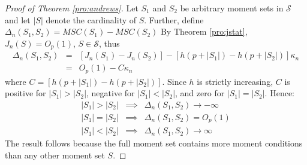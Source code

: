 \documentclass[12pt]{article}
\theoremstyle{definition}
\begin{document}
\begin{proof}[Proof of Theorem \ref{pro:andrews}]
Let $S_1$ and $S_2$ be arbitrary moment sets in $\mathscr{S}$ and let $|S|$ denote the cardinality of $S$. 
Further, define $\Delta_n(S_1, S_2) = MSC(S_1) - MSC(S_2)$
By Theorem \ref{pro:jstat}, $J_n(S) = O_p(1)$, $S \in \mathscr{S}$, thus
	\begin{eqnarray*}
			\Delta_n(S_1, S_2)	&=&   \left[J_{n}(S_1) - J_{n}(S_2)\right] - \left[h\left(p+|S_1|\right) - h\left(p+|S_2|\right)\right]\kappa_n\\
				&=& O_p(1) - C\kappa_n
	\end{eqnarray*}
where $C = \left[h\left(p+|S_1|\right) - h\left(p+|S_2|\right)\right]$. 
Since $h$ is strictly increasing, $C$ is positive for $|S_1|>|S_2|$, negative for $|S_1|<|S_2|$, and zero for $|S_1|=|S_2|$. 
Hence:
	\begin{eqnarray*}
		|S_1|>|S_2|&\implies& \Delta_n(S_1, S_2)  \rightarrow -\infty\\
		|S_1|=|S_2|&\implies&\Delta_n(S_1, S_2)  = O_p(1)\\
		|S_1|<|S_2|&\implies& \Delta_n(S_1, S_2)  \rightarrow \infty
\end{eqnarray*}
The result follows because the full moment set contains more moment conditions than any other moment set $S$.
\end{proof}
\end{document}
